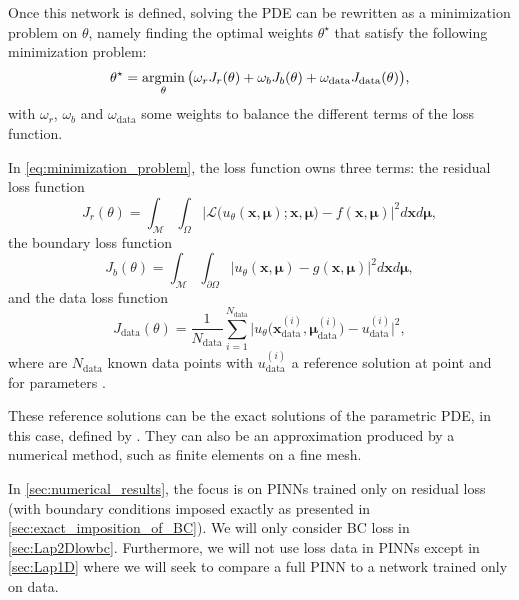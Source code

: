 Once this network is defined,
solving the PDE can be rewritten as a minimization problem on $\theta$,
namely finding the optimal weights $\theta^\star$
that satisfy the following minimization problem:
\begin{equation}
	\label{eq:minimization_problem}
	\theta^\star = \operatorname*{argmin}_{\theta}
	\big( \omega_r J_r(\theta) + \omega_b J_b(\theta) + \omega_\text{data} J_\text{data}(\theta) \big),
\end{equation}
with $\omega_r$, $\omega_b$ and $\omega_\text{data}$ some weights to balance the different terms of the loss function.

In \eqref{eq:minimization_problem}, the loss function owns three terms: the residual loss function
\begin{equation}
	\label{eq:residual_loss_parametric}
	J_r(\theta) =
	\int_{\mathcal{M}}\int_{\Omega}
	\big| \mathcal{L}\big(u_\theta(\bm{x},\bm{\mu});\bm{x},\bm{\mu}\big)-f(\bm{x},\bm{\mu}) \big|^2 d\bm{x} d\bm{\mu},
\end{equation}
the boundary loss function
\begin{equation}
	\label{eq:boundary_loss_parametric}
	J_b(\theta) =
	\int_{\mathcal{M}}\int_{\partial \Omega} \big| u_\theta(\bm{x},\bm{\mu}) - g(\bm{x},\bm{\mu}) \big|^2 d\bm{x} d\bm{\mu},
\end{equation}
and the data loss function
\begin{equation}
	\label{eq:data_loss_parametric}
	J_\text{data}(\theta) =
	\frac 1 {N_\text{data}} \sum_{i=1}^{N_\text{data}} \big| u_\theta\big(\bm{x}_\text{data}^{(i)},\bm{\mu}_\text{data}^{(i)}\big) - u_\text{data}^{(i)} \big|^2,
\end{equation}
where  are $N_\text{data}$ known data points with $u_\text{data}^{(i)}$ a reference solution at point  and for parameters .

\begin{remark}
	These reference solutions can be the exact solutions of the parametric PDE, in this case, defined by . They can also be an approximation produced by a numerical method, such as finite elements on a fine mesh.
\end{remark}

\begin{remark}
	In \cref{sec:numerical_results}, the focus is on PINNs trained only on residual loss (with boundary conditions imposed exactly as presented in \cref{sec:exact_imposition_of_BC}). We will only consider BC loss in \cref{sec:Lap2Dlowbc}. Furthermore, we will not use loss data in PINNs except in \cref{sec:Lap1D} where we will seek to compare a full PINN to a network trained only on data.
\end{remark}

